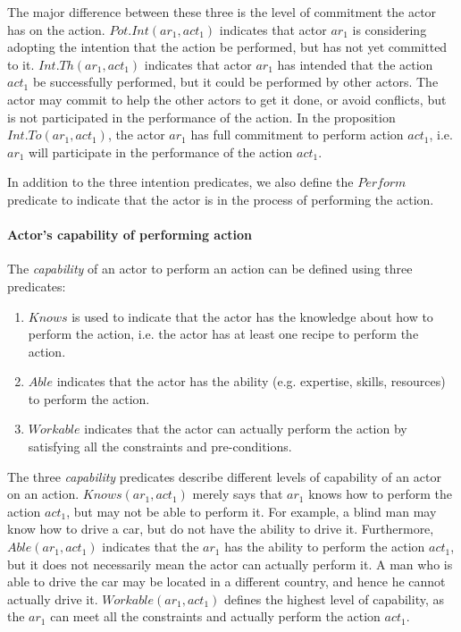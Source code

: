  The major difference between these three is the level of commitment the actor has on the action. $Pot.Int(ar_1, act_1)$ indicates that actor $ar_1$ is considering adopting the intention that the action be performed, but has not yet committed to it. $Int.Th(ar_1, act_1)$ indicates that actor $ar_1$ has intended that the action $act_1$ be successfully performed, but it could be performed by other actors. The actor may commit to help the other actors to get it done, or avoid conflicts, but is not participated in the performance of the action. In the proposition $Int.To(ar_1, act_1)$, the actor $ar_1$ has full commitment to perform action $act_1$, i.e. $ar_1$ will participate in the performance of the action $act_1$.

In addition to the three intention predicates, we also define the $Perform$ predicate to indicate that the actor is in the process of performing the action.


\paragraph*{Actor's capability of performing action} %
\label{par:actor_s_capability_of_performing_action}
The \emph{capability} of an actor to perform an action can be defined using three predicates:
\begin{enumerate}
	\item $Knows$ is used to indicate that the actor has the knowledge about how to perform the action, i.e. the actor has at least one recipe to perform the action.
	\item $Able$ indicates that the actor has the ability (e.g. expertise, skills, resources) to perform the action.
	\item $Workable$ indicates that the actor can actually perform the action by satisfying all the constraints and pre-conditions.
\end{enumerate}

The three \emph{capability} predicates describe different levels of capability of an actor on an action. $Knows(ar_1, act_1)$ merely says that $ar_1$ knows how to perform the action $act_1$, but may not be able to perform it. For example, a blind man may know how to drive a car, but do not have the ability to drive it. Furthermore, $Able(ar_1, act_1)$ indicates that the $ar_1$ has the ability to perform the action $act_1$, but it does not necessarily mean the actor can actually perform it. A man who is able to drive the car may be located in a different country, and hence he cannot actually drive it. $Workable(ar_1, act_1)$ defines the highest level of capability, as the $ar_1$ can meet all the constraints and actually perform the action $act_1$.

